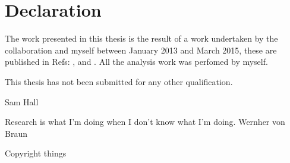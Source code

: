 \clearpage
\chapter*{\centering Declaration}

The work presented in this thesis is the result of a work undertaken by the
\lhcb collaboration and myself between January 2013 and March 2015, these are
published in Refs: \xxx, \xxx and \xxx.
All the analysis work was perfomed by myself.

This thesis has not been submitted for any other qualification.

{\flushright Sam Hall \xxx}

\vspace{5em}
Research is what I'm doing when I don't know what I'm doing.
Wernher von Braun

\vfill
Copyright things
